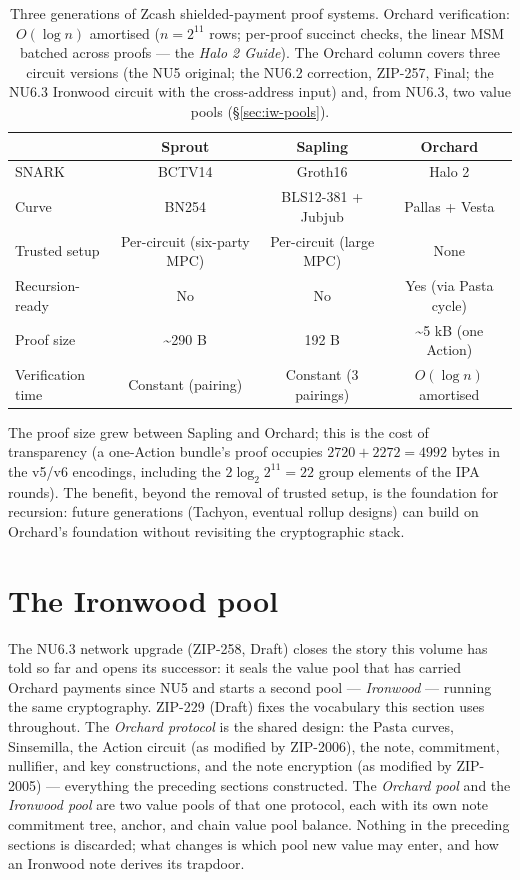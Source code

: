 \documentclass[11pt,a4paper]{article}
\theoremstyle{definition}
\begin{document}
\begin{table}[h]\centering\small
\begin{tabular}{@{}lccc@{}}
\toprule
& Sprout & Sapling & Orchard \\
\midrule
SNARK & BCTV14 & Groth16 & Halo 2 \\
Curve & BN254 & BLS12-381 + Jubjub & Pallas + Vesta \\
Trusted setup & Per-circuit (six-party MPC) & Per-circuit (large MPC) & None \\
Recursion-ready & No & No & Yes (via Pasta cycle) \\
Proof size & \textasciitilde 290 B & 192 B & \textasciitilde 5 kB (one Action) \\
Verification time & Constant (pairing) & Constant (3 pairings) & $O(\log n)$ amortised \\
\bottomrule
\end{tabular}
\caption{Three generations of Zcash shielded-payment proof systems.
Orchard verification: $O(\log n)$ amortised ($n = 2^{11}$ rows; per-proof
succinct checks, the linear MSM batched across proofs --- the \emph{Halo 2
Guide}). The Orchard column covers three circuit versions (the NU5
original; the NU6.2 correction, ZIP-257, Final; the NU6.3 Ironwood circuit
with the cross-address input) and, from NU6.3, two value pools
(\S\ref{sec:iw-pools}).}\label{tab:zcash-history}
\end{table}

The proof size grew between Sapling and Orchard; this is the cost of
transparency (a one-Action bundle's proof occupies $2720 + 2272 = 4992$
bytes in the v5/v6 encodings, including the $2\log_2 2^{11} = 22$ group
elements of the IPA rounds). The benefit, beyond the removal of trusted setup, is the
foundation for recursion: future generations (Tachyon, eventual rollup
designs) can build on Orchard's foundation without revisiting the
cryptographic stack.

\section{The Ironwood pool}\label{sec:iw}

The NU6.3 network upgrade (ZIP-258, Draft) closes the story this volume has
told so far and opens its successor: it seals the value pool that has carried
Orchard payments since NU5 and starts a second pool --- \emph{Ironwood} ---
running the same cryptography. ZIP-229 (Draft) fixes the vocabulary this
section uses throughout. The \emph{Orchard protocol} is the shared design:
the Pasta curves, Sinsemilla, the Action circuit (as modified by ZIP-2006),
the note, commitment, nullifier, and key constructions, and the note
encryption (as modified by ZIP-2005) --- everything the preceding sections
constructed. The \emph{Orchard pool} and the \emph{Ironwood pool} are two
value pools of that one protocol, each with its own note commitment tree,
anchor, and chain value pool balance. Nothing in the preceding sections is
discarded; what changes is which pool new value may enter, and how an
Ironwood note derives its trapdoor.
\end{document}
